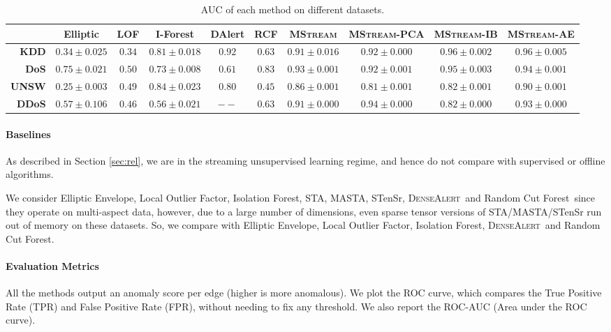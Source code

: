 \documentclass[sigconf]{acmart}
\newcommand{\method}{\textsc{MStream}}
\newcommand{\densealert}{\textsc{DenseAlert}}
\newcommand{\rcf}{Random Cut Forest}
\newcommand{\iso}{Isolation Forest}
\newcommand{\elliptic}{Elliptic Envelope}
\newcommand{\lof}{Local Outlier Factor}
\begin{document}
\begin{table*}[!htb]
\centering
\caption{AUC of each method on different datasets.}
\label{tab:auc}
\begin{tabular}{@{}rccccccccc@{}}
\toprule
& Elliptic
 & LOF
 & I-Forest
 &  DAlert
 & RCF
 & \textbf{\method}
 & \textbf{\method-PCA}
 & \textbf{\method-IB}
 & \textbf{\method-AE} \\ \midrule
 \textbf{KDD} & $0.34 \pm 0.025$ & $0.34$ &  $0.81 \pm 0.018$ & $0.92$ & $0.63$ &   $0.91 \pm 0.016$ & $0.92 \pm 0.000$ & $\mathbf{0.96} \pm 0.002$ & $\mathbf{0.96} \pm 0.005$ \\
 \textbf{DoS} & $0.75 \pm 0.021$ & $0.50$ & $0.73 \pm 0.008$ & $0.61$  & $0.83$ & $0.93 \pm 0.001$ & $0.92 \pm 0.001$ & $\mathbf{0.95} \pm 0.003$ & $0.94 \pm 0.001$ \\
  \textbf{UNSW} & $0.25 \pm 0.003$ & $0.49$ & $0.84 \pm 0.023$ & $0.80$ & $0.45$ & $0.86 \pm 0.001$ & $0.81 \pm 0.001$ & $0.82 \pm 0.001$ & $\mathbf{0.90} \pm 0.001$ \\
\textbf{DDoS} & $0.57 \pm 0.106$ & $0.46$ & $0.56 \pm 0.021$ & $--$ & $0.63$ &  $0.91 \pm 0.000$ & $\mathbf{0.94} \pm 0.000$ & $0.82 \pm 0.000$ & $0.93 \pm 0.000$ \\
\bottomrule
\end{tabular}
\end{table*}

\paragraph{\bf Baselines}
As described in Section \ref{sec:rel}, we are in the streaming unsupervised learning regime, and hence do not compare with supervised or offline algorithms.

We consider \elliptic, \lof, \iso, STA, MASTA, STenSr, \densealert\ and \rcf\ since they operate on multi-aspect data, however, due to a large number of dimensions, even sparse tensor versions of STA/MASTA/STenSr run out of memory on these datasets. So, we compare with \elliptic, \lof, \iso, \densealert\ and \rcf.

\paragraph{\bf Evaluation Metrics}
All the methods output an anomaly score per edge (higher is more anomalous). We plot the ROC curve, which compares the True Positive Rate (TPR) and False Positive Rate (FPR), without needing to fix any threshold. We also report the ROC-AUC (Area under the ROC curve).
\end{document}
